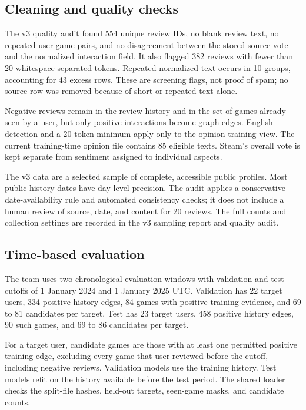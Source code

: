 \documentclass[11pt]{article}
\begin{document}
\subsection{Cleaning and quality checks}

The v3 quality audit found 554 unique review IDs, no blank review text, no repeated user-game pairs, and no disagreement between the stored source vote and the normalized interaction field. It also flagged 382 reviews with fewer than 20 whitespace-separated tokens. Repeated normalized text occurs in 10 groups, accounting for 43 excess rows. These are screening flags, not proof of spam; no source row was removed because of short or repeated text alone.

Negative reviews remain in the review history and in the set of games already seen by a user, but only positive interactions become graph edges. English detection and a 20-token minimum apply only to the opinion-training view. The current training-time opinion file contains 85 eligible texts. Steam's overall vote is kept separate from sentiment assigned to individual aspects.

The v3 data are a selected sample of complete, accessible public profiles. Most public-history dates have day-level precision. The audit applies a conservative date-availability rule and automated consistency checks; it does not include a human review of source, date, and content for 20 reviews. The full counts and collection settings are recorded in the v3 sampling report and quality audit.

\subsection{Time-based evaluation}

The team uses two chronological evaluation windows with validation and test cutoffs of 1 January 2024 and 1 January 2025 UTC. Validation has 22 target users, 334 positive history edges, 84 games with positive training evidence, and 69 to 81 candidates per target. Test has 23 target users, 458 positive history edges, 90 such games, and 69 to 86 candidates per target.

For a target user, candidate games are those with at least one permitted positive training edge, excluding every game that user reviewed before the cutoff, including negative reviews. Validation models use the training history. Test models refit on the history available before the test period. The shared loader checks the split-file hashes, held-out targets, seen-game masks, and candidate counts.
\end{document}
